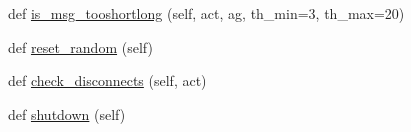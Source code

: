 \begin{DoxyCompactItemize}
\item 
def \hyperlink{classparlai_1_1mturk_1_1tasks_1_1convai2__model__eval_1_1worlds_1_1Convai2EvalWorld_a71bd41e61be058353520917731662a3d}{is\+\_\+msg\+\_\+tooshortlong} (self, act, ag, th\+\_\+min=3, th\+\_\+max=20)
\item 
def \hyperlink{classparlai_1_1mturk_1_1tasks_1_1convai2__model__eval_1_1worlds_1_1Convai2EvalWorld_a5ddc0b7a6cc22dcfc9da077e70fd7f44}{reset\+\_\+random} (self)
\item 
def \hyperlink{classparlai_1_1mturk_1_1tasks_1_1convai2__model__eval_1_1worlds_1_1Convai2EvalWorld_a53f3038cc93afa14d4b4a9fb72d6ca73}{check\+\_\+disconnects} (self, act)
\item 
def \hyperlink{classparlai_1_1mturk_1_1tasks_1_1convai2__model__eval_1_1worlds_1_1Convai2EvalWorld_a3b678b4be13ff3d6fd8fb7caab68cf43}{shutdown} (self)
\end{DoxyCompactItemize}

